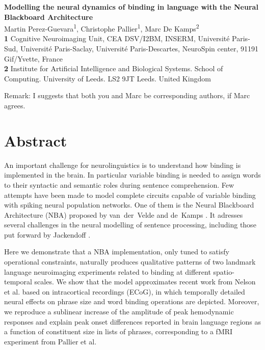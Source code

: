 \documentclass[10pt]{article}
\date{}
\begin{document}
\vspace*{0.2in}

\begin{flushleft} {\LARGE \textbf{Modelling the neural dynamics of
      binding in language with the Neural Blackboard Architecture} }
  \newline
  \\

  Martin Perez-Guevara\textsuperscript{1}, Christophe Pallier\textsuperscript{1}, Marc De Kamps\textsuperscript{2}
  \\
  \bigskip \textbf{1} Cognitive Neuroimaging Unit, CEA DSV/I2BM,
  INSERM, Université Paris-Sud, Université Paris-Saclay,
  Université Paris-Descartes, NeuroSpin center, 91191 Gif/Yvette, France
  \\
  \textbf{2} Institute for Artificial Intelligence and Biological
  Systems. School of Computing. University of Leeds. LS2 9JT Leeds.
  United Kingdom
  \\
  \bigskip

Remark: I suggests that both you and Marc be corresponding authors, if Marc agrees.
  
\end{flushleft}


\section*{Abstract}

An important challenge for neurolinguistics is to understand how binding is implemented in the brain.
In particular variable binding is needed to assign words to their syntactic and semantic roles during sentence comprehension. 
Few attempts have been made to model complete circuits capable of variable binding with spiking neural population networks.
One of them is the Neural Blackboard Architecture (NBA) proposed by van~der~Velde and de~Kamps \cite{van_der_Velde_2006}.
It adresses several challenges in the neural modelling of sentence processing, including those put forward by Jackendoff \cite{Jackendoff_2002b}.

Here we demonstrate that a NBA implementation, only tuned to satisfy operational constraints, naturally produces qualitative patterns of two landmark language neuroimaging experiments related to binding at different spatio-temporal scales.
We show that the model approximates recent work from Nelson et al. \cite{Nelson_2017} based on intracortical recordings (ECoG), in which temporally detailed neural effects on phrase size and word binding operations are depicted. 
Moreover, we reproduce a sublinear increase of the amplitude of peak hemodynamic responses and explain peak onset differences reported in brain language regions as a function of constituent size in lists of phrases, corresponding to a fMRI experiment from Pallier et al. \cite{Pallier_2011}
\end{document}
